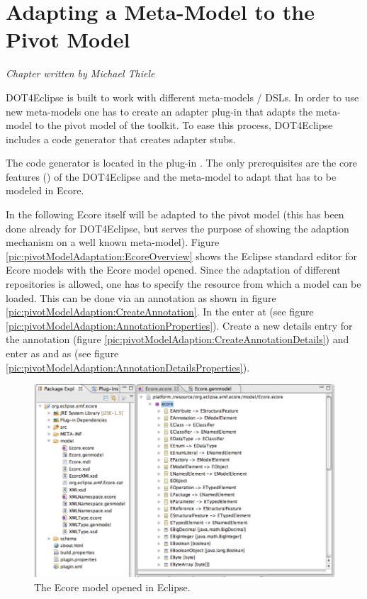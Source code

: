 \chapter{Adapting a Meta-Model to the Pivot Model}
\label{chapter:pivotModelAdaptation}

\begin{flushright}
\textit{Chapter written by Michael Thiele}
\end{flushright}

\acl{DOT4Eclipse} is built to work with different meta-models / DSLs. In order to use new meta-models one has to create an adapter plug-in that adapts the meta-model to the pivot model of the toolkit. To ease this process, \acl{DOT4Eclipse} includes a code generator that creates adapter stubs.

The code generator is located in the plug-in . The only prerequisites are the core features () of the \acl{DOT4Eclipse} and the meta-model to adapt that has to be modeled in Ecore.

In the following Ecore itself will be adapted to the pivot model (this has been done already for \acl{DOT4Eclipse}, but serves the purpose of showing the adaption mechanism on a well known meta-model). Figure \ref{pic:pivotModelAdaptation:EcoreOverview} shows the Eclipse standard editor for Ecore models with the Ecore model opened. Since the adaptation of different repositories is allowed, one has to specify the resource from which a model can be loaded. This can be done via an annotation as shown in figure \ref{pic:pivotModelAdaption:CreateAnnotation}. In the  enter  at  (see figure \ref{pic:pivotModelAdaption:AnnotationProperties}). Create a new details entry for the annotation (figure \ref{pic:pivotModelAdaption:CreateAnnotationDetails}) and enter  as  and  as  (see figure \ref{pic:pivotModelAdaption:AnnotationDetailsProperties}).

\begin{figure}[!htbp]
	\centering
	\includegraphics[width=1.0\linewidth]{figures/pivotModelAdaption/EcoreOverview}
	\caption{The Ecore model opened in Eclipse.}
	\label{pic:pivotModelAdaption:EcoreOverview}
\end{figure}

